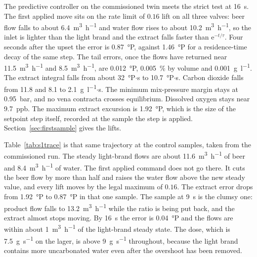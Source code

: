 The predictive controller on the commissioned twin meets the strict test at \SI{16}{\second}. The first applied move sits on the rate limit of $0.16$ lift on all three valves: beer flow falls to about \SI{6.4}{\cubic\metre\per\hour} and water flow rises to about \SI{10.2}{\cubic\metre\per\hour}, so the inlet is lighter than the light brand and the extract falls faster than $\mathrm{e}^{-t/\tau}$. Four seconds after the upset the error is \SI{0.87}{\degree}P, against \SI{1.46}{\degree}P for a residence-time decay of the same step. The tail errors, once the flows have returned near \SI{11.5}{\cubic\metre\per\hour} and \SI{8.5}{\cubic\metre\per\hour}, are \SI{0.012}{\degree}P, \SI{0.005}{\percent} by volume and \SI{0.001}{\gram\per\litre}. The extract integral falls from about \SI{32}{\degree}P$\cdot$s to \SI{10.7}{\degree}P$\cdot$s. Carbon dioxide falls from \SI{11.8}{} and \SI{8.1}{} to \SI{2.1}{\gram\per\litre}$\cdot$s. The minimum mix-pressure margin stays at \SI{0.95}{bar}, and no vena contracta crosses equilibrium. Dissolved oxygen stays near \SI{9.7}{ppb}. The maximum extract excursion is \SI{1.92}{\degree}P, which is the size of the setpoint step itself, recorded at the sample the step is applied. Section~\ref{sec:firstsample} gives the lifts.

Table~\ref{tab:s1trace} is that same trajectory at the control samples, taken from the commissioned run. The steady light-brand flows are about \SI{11.6}{\cubic\metre\per\hour} of beer and \SI{8.4}{\cubic\metre\per\hour} of water. The first applied command does not go there. It cuts the beer flow by more than half and raises the water flow above the new steady value, and every lift moves by the legal maximum of $0.16$. The extract error drops from \SI{1.92}{\degree}P to \SI{0.87}{\degree}P in that one sample. The sample at \SI{9}{\second} is the clumsy one: product flow falls to \SI{13.2}{\cubic\metre\per\hour} while the ratio is being put back, and the extract almost stops moving. By \SI{16}{\second} the error is \SI{0.04}{\degree}P and the flows are within about \SI{1}{\cubic\metre\per\hour} of the light-brand steady state. The dose, which is \SI{7.5}{\gram\per\second} on the lager, is above \SI{9}{\gram\per\second} throughout, because the light brand contains more uncarbonated water even after the overshoot has been removed.

